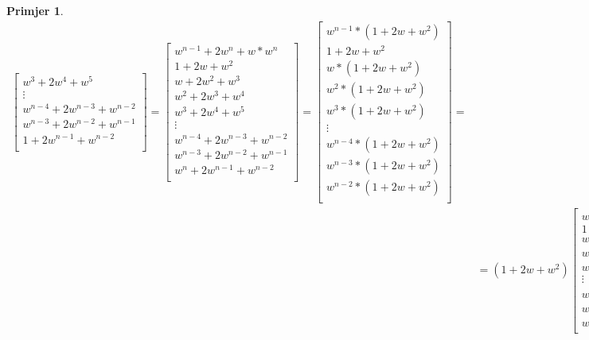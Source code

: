 \documentclass[11pt]{article}
\newtheorem{example}{Primjer}
\begin{document}
\begin{example}
\[\begin{split}
\begin{bmatrix}
		w^3 + 2w^4 + w^5  \\
		\vdots \\
		w^{n-4} + 2w^{n-3} + w^{n-2} \\
		w^{n-3} + 2w^{n-2} + w^{n-1} \\
		1 + 2w^{n-1} + w^{n-2} \\
		\end{bmatrix}
		= 
		\begin{bmatrix}
		w^{n-1} + 2 w^n + w * w^{n} \\
		1 + 2w + w^2       \\
		w + 2w^2 + w^3       \\
		w^2 + 2w^3 + w^4  \\
		w^3 + 2w^4 + w^5  \\
		\vdots \\
		w^{n-4} + 2w^{n-3} + w^{n-2} \\
		w^{n-3} + 2w^{n-2} + w^{n-1} \\
		w^n + 2w^{n-1} + w^{n-2} \\
		\end{bmatrix}
		= 
		\begin{bmatrix}
		w^{n-1} * ( 1+ 2 w + w^2) \\
		1 + 2w + w^2       \\
		w * (1 + 2w + w^2)       \\
		w^2 * (1 + 2w + w^2)       \\
		w^3 * (1 + 2w + w^2)       \\
		\vdots \\
		w^{n-4} * (1 + 2w + w^2)       \\
		w^{n-3} * (1 + 2w + w^2)       \\
		w^{n-2} * (1 + 2w + w^2)       \\
		\end{bmatrix} = \\
		& = (1 + 2w + w^2)
		\begin{bmatrix}
		w^{n-1}  \\
		1        \\
		w        \\
		w^2      \\
		w^3      \\
		\vdots   \\
		w^{n-4}  \\
		w^{n-3}  \\
		w^{n-2}  \\
		\end{bmatrix}
		= 
		w (w^{-1} + 2 + w)
		\begin{bmatrix}

\end{bmatrix}
\end{split}\]
\end{example}
\end{document}
